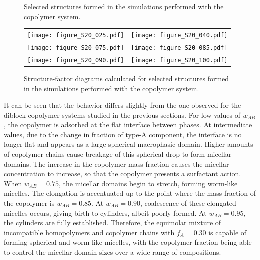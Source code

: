 \documentclass[
aip,
jcp,
reprint,
]{revtex4-1}
\begin{document}
\begin{figure}
\begin{tabular}{C{1.6in}@{}C{1.6in}}
	\end{tabular}
	\caption{Selected structures formed in the simulations performed with the  copolymer system.}
	\label{fig:Figure_17}
\end{figure}


\begin{figure}
	\centering
	\begin{tabular}{C{1.6in}@{}C{1.6in}}
		\texttt{[image: figure\_S20\_025.pdf]} & \texttt{[image: figure\_S20\_040.pdf]} \\
		\texttt{[image: figure\_S20\_075.pdf]} & \texttt{[image: figure\_S20\_085.pdf]} \\		\texttt{[image: figure\_S20\_090.pdf]} & \texttt{[image: figure\_S20\_100.pdf]} \\	
	\end{tabular}
	\caption{Structure-factor diagrams calculated for selected structures formed in the simulations performed with the  copolymer system.}
	\label{fig:Figure_18}
\end{figure}


It can be seen that the behavior differs slightly from the one observed for the diblock copolymer systems studied in the previous sections.
For low values of $w_{AB}$, the copolymer is adsorbed at the flat interface between phases.
At intermediate values, due to the change in fraction of type-A component, the interface is no longer flat and appears as a large spherical macrophasic domain.
Higher amounts of copolymer chains cause breakage of this spherical drop to form micellar domains.
The increase in the copolymer mass fraction causes the micellar concentration to increase, so that the copolymer presents a surfactant action.
When $w_{AB}=0.75$, the micellar domains begin to stretch, forming worm-like micelles.
The elongation is accentuated up to the point where the mass fraction of the copolymer is $w_{AB}=0.85$. At $w_{AB}=0.90$, coalescence of these elongated micelles occurs, giving birth to cylinders, albeit poorly formed.
At $w_{AB}=0.95$, the cylinders are fully established.
Therefore, the equimolar mixture of incompatible homopolymers and copolymer chains with $f_A=0.30$ is capable of forming spherical and worm-like micelles, with the copolymer fraction being able to control the micellar domain sizes over a wide range of compositions.
\end{document}

